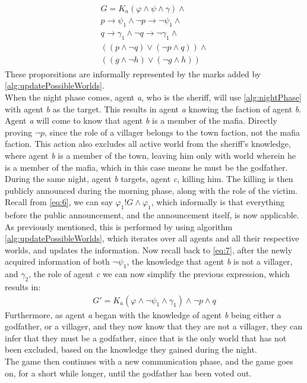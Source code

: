 \begin{align}
	\begin{split}
		G = K_a(\varphi \land \psi \land\gamma)\land                        \\
		p \rightarrow \psi_1 \land \neg p \rightarrow \neg \psi_1 \land     \\
		q \rightarrow \gamma_1 \land \neg q \rightarrow \neg \gamma_1 \land \\
		((p \land \neg q) \lor (\neg p \land q)) \land                      \\
		((g \land \neg h) \lor (\neg g \land h))
		\label{eq:7}
	\end{split}
\end{align}
These proporsitions are informally represented by the marks added by \cref{alg:updatePossibleWorlds}.\\
When the night phase comes, agent \textit{a}, who is the sheriff, will use \cref{alg:nightPhase} with agent \textit{b} as the target. This results in agent \textit{a} knowing the faction of agent \textit{b}. Agent
\textit{a} will come to know that agent \textit{b} is a member of the mafia.
Directly proving $\neg p$, since the role of a villager belongs to the town
faction, not the mafia faction. This action also excludes all active world from
the sheriff's knowledge, where agent \textit{b} is a member of the town,
leaving him only with world wherein he is a member of the mafia, which in this
case means he must be the godfather. During the same night, agent \textit{b}
targets, agent \textit{c}, killing him. The killing is then publicly announced
during the morning phase, along with the role of the victim. Recall from
\cref{eq:6}, we can say $\varphi_1!G\land\varphi_1$, which informally is that
everything before the public announcement, and the announcement itself, is now
applicable. As previously mentioned, this is performed by using algorithm
\ref{alg:updatePossibleWorlds}, which iterates over all agents and all their
respective worlds, and updates the information. Now recall back to \cref{eq:7},
after the newly acquired information of both $\neg \psi_1$, the knowledge that
agent \textit{b} is not a villager, and $\gamma_2$, the role of agent
\textit{c} we can now simplify the previous expression, which results in:
\begin{align}
	G' = K_a(\varphi \land \neg \psi_1 \land \gamma_1) \land \neg p \land q
\end{align}
Furthermore, as agent \textit{a} began with the knowledge of agent \textit{b}
being either a godfather, or a villager, and they now know that they are not a
villager, they can infer that they must be a godfather, since that is the only
world that has not been excluded, based on the knowledge they gained during the
night. \\
The game then continues with a new communication phase, and the game goes on,
for a short while longer, until the godfather has been voted out.
